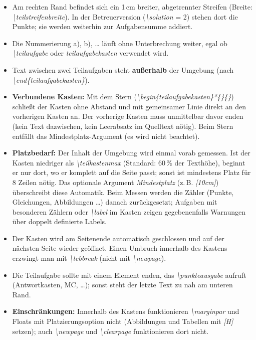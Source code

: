 \documentclass[../main.tex]{subfiles}
\begin{document}
\begin{itemize}
    \item Am rechten Rand befindet sich ein 1\,cm breiter, abgetrennter Streifen (Breite: \textit{\textbackslash teilstreifenbreite}). In der Betreuerversion (\textit{\textbackslash solution} = 2) stehen dort die Punkte; sie werden weiterhin zur Aufgabensumme addiert.
    \item Die Nummerierung a), b), \dots{} l\"auft ohne Unterbrechung weiter, egal ob \textit{\textbackslash teilaufgabe} oder \textit{teilaufgabekasten} verwendet wird.
    \item Text zwischen zwei Teilaufgaben steht \textbf{au\ss{}erhalb} der Umgebung (nach \textit{\textbackslash end\{teilaufgabekasten\}}).
    \item \textbf{Verbundene Kasten:} Mit dem Stern (\textit{\textbackslash begin\{teilaufgabekasten\}*\{\}\{\}}) schlie\ss{}t der Kasten ohne Abstand und mit gemeinsamer Linie direkt an den vorherigen Kasten an. Der vorherige Kasten muss unmittelbar davor enden (kein Text dazwischen, kein Leerabsatz im Quelltext n\"otig). Beim Stern entf\"allt das Mindestplatz-Argument (es wird nicht beachtet).
    \item \textbf{Platzbedarf:} Der Inhalt der Umgebung wird einmal vorab gemessen. Ist der Kasten niedriger als \textit{\textbackslash teilkastenmax} (Standard: 60\,\% der Texth\"ohe), beginnt er nur dort, wo er komplett auf die Seite passt; sonst ist mindestens Platz f\"ur 8 Zeilen n\"otig. Das optionale Argument \textit{Mindestplatz} (z.\,B. \textit{[10cm]}) \"uberschreibt diese Automatik. Beim Messen werden die Z\"ahler (Punkte, Gleichungen, Abbildungen \dots) danach zur\"uckgesetzt; Aufgaben mit besonderen Z\"ahlern oder \textit{\textbackslash label} im Kasten zeigen gegebenenfalls Warnungen \"uber doppelt definierte Labels.
    \item Der Kasten wird am Seitenende automatisch geschlossen und auf der n\"achsten Seite wieder ge\"offnet. Einen Umbruch innerhalb des Kastens erzwingt man mit \textit{\textbackslash tcbbreak} (nicht mit \textit{\textbackslash newpage}).
    \item Die Teilaufgabe sollte mit einem Element enden, das \textit{\textbackslash punkteausgabe} aufruft (Antwortkasten, MC, \dots); sonst steht der letzte Text zu nah am unteren Rand.
    \item \textbf{Einschr\"ankungen:} Innerhalb des Kastens funktionieren \textit{\textbackslash marginpar} und Floats mit Platzierungsoption nicht (Abbildungen und Tabellen mit \textit{[H]} setzen); auch \textit{\textbackslash newpage} und \textit{\textbackslash clearpage} funktionieren dort nicht.
\end{itemize}
\end{document}
